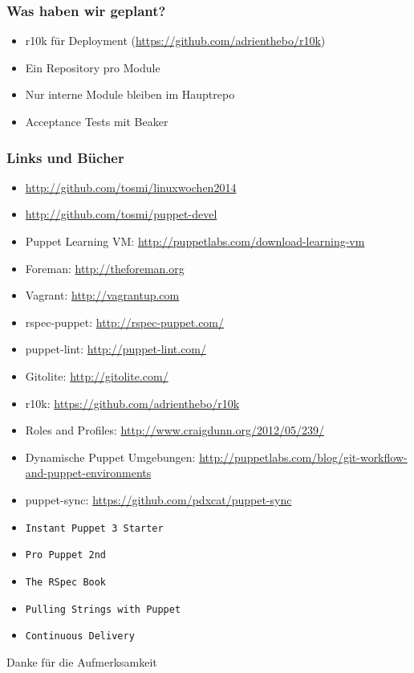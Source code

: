\documentclass{beamer}
\begin{document}
\begin{frame}
  \frametitle{Was haben wir geplant?}

  \begin{itemize}
  \item r10k für Deployment (\url{https://github.com/adrienthebo/r10k})
  \item Ein Repository pro Module
  \item Nur interne Module bleiben im Hauptrepo
  \item Acceptance Tests mit Beaker
  \end{itemize}
\end{frame}

\begin{frame}
  \frametitle{Links und Bücher}
\tiny
  \begin{itemize}
  \item \url{http://github.com/tosmi/linuxwochen2014}
  \item \url{http://github.com/tosmi/puppet-devel}
  \item Puppet Learning VM: \url{http://puppetlabs.com/download-learning-vm}
  \item Foreman: \url{http://theforeman.org}
  \item Vagrant: \url{http://vagrantup.com}
  \item rspec-puppet: \url{http://rspec-puppet.com/}
  \item puppet-lint: \url{http://puppet-lint.com/}
  \item Gitolite: \url {http://gitolite.com/}
  \item r10k: \url{https://github.com/adrienthebo/r10k}
  \item Roles and Profiles: \url{http://www.craigdunn.org/2012/05/239/}
  \item Dynamische Puppet Umgebungen: \url{http://puppetlabs.com/blog/git-workflow-and-puppet-environments}
  \item puppet-sync: \url{https://github.com/pdxcat/puppet-sync}
  \item \texttt{Instant Puppet 3 Starter}
  \item \texttt{Pro Puppet 2nd}
  \item \texttt{The RSpec Book}
  \item \texttt{Pulling Strings with Puppet}
  \item \texttt{Continuous Delivery}
  \end{itemize}
\end{frame}

\begin{frame}
  \huge{Danke für die Aufmerksamkeit}
\end{frame}
\end{document}

